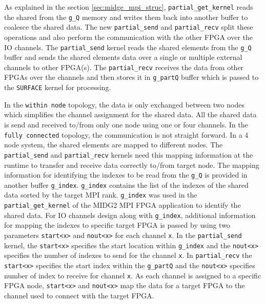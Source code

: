As explained in the section \ref{sec:midge_mpi_struc}, \texttt{partial\_get\_kernel} reads
the shared from the \texttt{g\_Q} memory and writes them back into another buffer
to coalesce the shared data. The new \texttt{partial\_send} and \texttt{partial\_recv}
split these operations and also perform the communication with the
other FPGA over the IO channels. The \texttt{partial\_send} kernel reads the
shared elements from the \texttt{g\_Q} buffer and sends the shared elements data
over a single or multiple external channels to other FPGA(s).
The \texttt{partial\_recv} receives the data from other FPGAs over the channels and
then stores it in \texttt{g\_partQ} buffer which is passed to the \texttt{SURFACE}
kernel for processing.

In the \texttt{within node} topology, the data is only exchanged between two nodes
which simplifies the channel assignment for the shared data. All the shared data is send and received
to/from only one node using one or four channels. In the \texttt{fully connected} topology,
the communication is not straight forward. In a 4 node system, the shared elements are mapped
to different nodes. The \texttt{partial\_send} and \texttt{partial\_recv} kernels need this mapping
information at the runtime to transfer and receive data correctly to/from target node. The mapping information
for identifying the indexes to be read from the \texttt{g\_Q} is provided in another buffer
\texttt{g\_index}. \texttt{g\_index} contains the list of the indexes of the shared data
sorted by the target MPI rank. \texttt{g\_index} was used in the \texttt{partial\_get\_kernel}
of the MIDG2 MPI FPGA application to identify the shared data. For IO channels design along with
\texttt{g\_index}, additional information for mapping the indexes to specific target FPGA is
passed by using two parameters \texttt{start<x>} and \texttt{nout<x>} for each channel \texttt{x}.
In the \texttt{partial\_send} kernel, the \texttt{start<x>} specifies the start location within \texttt{g\_index}
and the \texttt{nout<x>} specifies the number of indexes to send for the channel \texttt{x}. In
\texttt{partial\_recv} the \texttt{start<x>} specifies the start index within the \texttt{g\_partQ}
and the \texttt{nout<x>} specifies number of index to receive for channel \texttt{x}. As each
channel is assigned to a specific FPGA node, \texttt{start<x>} and \texttt{nout<x>} map
the data for a target FPGA to the channel used to connect with the target FPGA.

